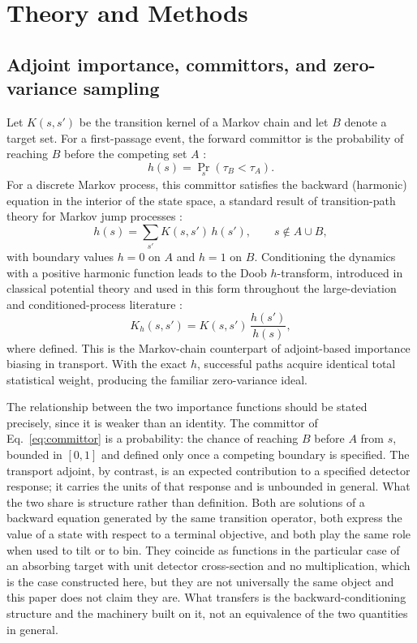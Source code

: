 \documentclass[a4paper,fleqn]{cas-sc}
\begin{document}
\section{Theory and Methods}\label{sec:methods}

\subsection{Adjoint importance, committors, and zero-variance sampling}\label{sec:adjoint}
Let $K(s,s')$ be the transition kernel of a Markov chain and let $B$ denote a target set.
For a first-passage event, the forward committor is the probability of reaching $B$ before
the competing set $A$ \citep{e2006,metzner2009}:
\begin{equation}
h(s)=\Pr_{s}\!\left(\tau_B<\tau_A\right).
\label{eq:committor}
\end{equation}
For a discrete Markov process, this committor satisfies the backward (harmonic) equation in
the interior of the state space, a standard result of transition-path theory for Markov jump
processes \citep{e2006,metzner2009,vandeneijnden2010}:
\begin{equation}
h(s)=\sum_{s'}K(s,s')\,h(s'),\qquad s\notin A\cup B,
\label{eq:harmonic}
\end{equation}
with boundary values $h=0$ on $A$ and $h=1$ on $B$. Conditioning the dynamics with a
positive harmonic function leads to the Doob $h$-transform, introduced in classical potential
theory \citep{doob1984} and used in this form throughout the large-deviation and
conditioned-process literature \citep{touchette2009,chetrite2015}:
\begin{equation}
K_h(s,s')=K(s,s')\,\frac{h(s')}{h(s)},
\label{eq:doob}
\end{equation}
where defined. This is the Markov-chain counterpart of adjoint-based importance biasing in
transport. With the exact $h$, successful paths acquire identical total statistical weight,
producing the familiar zero-variance ideal.

The relationship between the two importance functions should be stated precisely, since it is
weaker than an identity. The committor of Eq.~\eqref{eq:committor} is a probability: the chance
of reaching $B$ before $A$ from $s$, bounded in $[0,1]$ and defined only once a competing
boundary is specified. The transport adjoint, by contrast, is an expected contribution to a
specified detector response; it carries the units of that response and is unbounded in
general. What the two share is structure rather than definition. Both are solutions of a
backward equation generated by the same transition operator, both express the value of a state
with respect to a terminal objective, and both play the same role when used to tilt or to bin.
They coincide as functions in the particular case of an absorbing target with unit detector
cross-section and no multiplication, which is the case constructed here, but they are not
universally the same object and this paper does not claim they are. What transfers is the
backward-conditioning structure and the machinery built on it, not an equivalence of the two
quantities in general.
\end{document}
